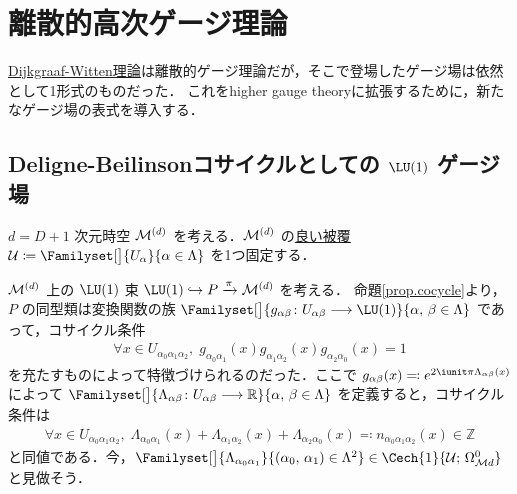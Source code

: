 \documentclass[TQFT_main]{subfiles}
\begin{document}
\section{離散的高次ゲージ理論}

\hyperref[def:Dijkgraaf-Witten]{Dijkgraaf-Witten理論}は離散的ゲージ理論だが，そこで登場したゲージ場は依然として1形式のものだった．
これをhigher gauge theoryに拡張するために，新たなゲージ場の表式を導入する．

\subsection{Deligne-Beilinsonコサイクルとしての $\LU (1)$ ゲージ場}

$d = D+1$ 次元時空 $\mathcal{M}^{(d)}$ を考える．$\mathcal{M}^{(d)}$ の\hyperref[def:good-cover]{良い被覆} $\mathcal{U} \coloneqq \Familyset[\big]{U_\alpha}{\alpha \in \Lambda}$ を1つ固定する．

$\mathcal{M}^{(d)}$ 上の $\LU(1)$ 束 $\LU(1) \hookrightarrow P \xrightarrow{\pi} \mfdcal{M}{d}$ を考える．
命題\ref{prop.cocycle}より，$P$ の同型類は変換関数の族 $\Familyset[\big]{g_{\alpha\beta} \colon U_{\alpha\beta} \lto \LU(1)}{\alpha,\, \beta \in \Lambda}$ であって，コサイクル条件
\begin{align}
    \forall x \in U_{\alpha_0\alpha_1\alpha_2},\; g_{\alpha_0\alpha_1}(x) g_{\alpha_1\alpha_2}(x) g_{\alpha_2\alpha_0}(x) = 1
\end{align}
を充たすものによって特徴づけられるのだった．ここで $g_{\alpha\beta}(x) \eqqcolon e^{2\iunit \pi \Lambda_{\alpha\beta}(x)}$ によって $\Familyset[\big]{\Lambda_{\alpha\beta} \colon U_{\alpha\beta} \lto \mathbb{R}}{\alpha,\, \beta \in \Lambda}$ を定義すると，コサイクル条件は
\begin{align}
    \forall x \in U_{\alpha_0\alpha_1\alpha_2},\; \Lambda_{\alpha_0\alpha_1}(x) + \Lambda_{\alpha_1\alpha_2}(x) + \Lambda_{\alpha_2\alpha_0}(x) \eqqcolon n_{\alpha_0\alpha_1\alpha_2}(x) \in \mathbb{Z}
\end{align}
と同値である．今，$\Familyset[\big]{\Lambda_{\alpha_0\alpha_1}}{(\alpha_0,\, \alpha_1) \in \Lambda^2} \in \Cech{1}{\mathcal{U};\, \Omega_{\mathcal{M}{d}}^0}$ と見做そう．
\end{document}
